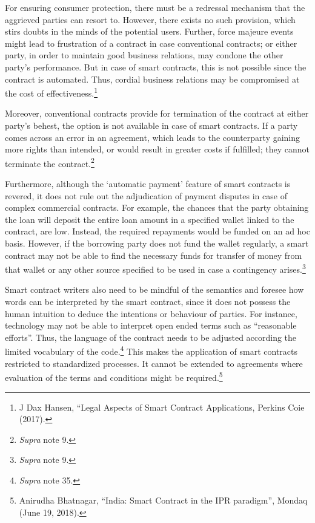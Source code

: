 \begin{multicols}{2}
\noi
For ensuring consumer protection, there must be a redressal mechanism that the aggrieved
parties can resort to. However, there exists no such provision, which stirs doubts in the minds
of the potential users. Further, force majeure events might lead to frustration of a contract in
case conventional contracts; or either party, in order to maintain good business relations, may
condone the other party’s performance. But in case of smart contracts, this is not possible
since the contract is automated. Thus, cordial business relations may be compromised at the
cost of effectiveness.\footnote{J Dax Hansen, “Legal Aspects of Smart Contract Applications, Perkins Coie (2017).}

\noi
Moreover, conventional contracts provide for termination of the contract at either party’s
behest, the option is not available in case of smart contracts. If a party comes across an error
in an agreement, which leads to the counterparty gaining more rights than intended, or would
result in greater costs if fulfilled; they cannot terminate the contract.\footnote{\textit{Supra} note 9.}

\noi
Furthermore, although the ‘automatic payment’ feature of smart contracts is revered, it does
not rule out the adjudication of payment disputes in case of complex commercial contracts.
For example, the chances that the party obtaining the loan will deposit the entire loan amount
in a specified wallet linked to the contract, are low. Instead, the required repayments would
be funded on an ad hoc basis. However, if the borrowing party does not fund the wallet
regularly, a smart contract may not be able to find the necessary funds for transfer of money
from that wallet or any other source specified to be used in case a contingency arises.\footnote{\textit{Supra} note 9.}

\vspace{-.1cm}

\noi
Smart contract writers also need to be mindful of the semantics and foresee how words can be
interpreted by the smart contract, since it does not possess the human intuition to deduce the
intentions or behaviour of parties. For instance, technology may not be able to interpret open
ended terms such as “reasonable efforts”. Thus, the language of the contract needs to be
adjusted according the limited vocabulary of the code.\footnote{\textit{Supra} note 35.} This makes the application of smart contracts restricted to standardized processes. It cannot be extended to agreements where
evaluation of the terms and conditions might be required.\footnote{Anirudha Bhatnagar, “India: Smart Contract in the IPR paradigm”, Mondaq (June 19, 2018). }


\end{multicols}
